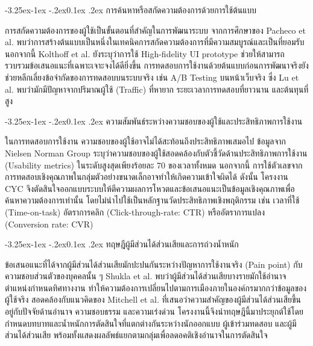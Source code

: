 \documentclass[a4paper,oneside]{cpe-thesis-th}
\makeatletter
\renewcommand\subsection{\@startsection{subsection}{2}{\z@}%
   {-3.25ex\@plus -1ex \@minus -.2ex}{0.1ex \@plus .2ex}%
   {\normalfont\thsz@subsection\bfseries}}
\newcommand{\thaijustify}[1]{%
  \par\hspace{30pt}\justifying
  #1
}
\makeatother
\begin{document}
\subsection{การค้นหาหรือสกัดความต้องการด้วยการใช้ต้นแบบ}
\thaijustify{
  การสกัดความต้องการของผู้ใช้เป็นขั้นตอนที่สำคัญในการพัฒนาระบบ จากการศึกษาของ Pacheco et al. \cite{pacheco2018} พบว่าการสร้างต้นแบบเป็นหนึ่งในเทคนิคการสกัดความต้องการที่มีความสมบูรณ์และเป็นที่ยอมรับ นอกจากนี้ Kolthoff et al. \cite{kolthoff2024} ยังระบุว่าการใช้ High-fidelity UI prototype ช่วยให้สามารถรวบรวมข้อเสนอแนะที่เฉพาะเจาะจงได้ดียิ่งขึ้น การทดสอบการใช้งานด้วยต้นแบบก่อนการพัฒนาจริงยังช่วยหลีกเลี่ยงข้อจำกัดของการทดสอบบนระบบจริง เช่น A/B Testing บนหน้าเว็บจริง ซึ่ง Lu et al. \cite{lu2026} พบว่ามักมีปัญหาจากปริมาณผู้ใช้ (Traffic) ที่หายาก ระยะเวลาการทดสอบที่ยาวนาน และต้นทุนที่สูง
}

\subsection{ความสัมพันธ์ระหว่างความชอบของผู้ใช้และประสิทธิภาพการใช้งาน}
\thaijustify{
  ในการทดสอบการใช้งาน ความชอบของผู้ใช้อาจไม่ได้สะท้อนถึงประสิทธิภาพเสมอไป ข้อมูลจาก Nielsen Norman Group \cite{nngroup_satisfaction} ระบุว่าความชอบของผู้ใช้สอดคล้องกับตัวชี้วัดด้านประสิทธิภาพการใช้งาน (Usability metrics) ในระดับสูงสุดเพียงร้อยละ 70 ของเวลาทั้งหมด นอกจากนี้ การใช้ตัวเลขจากการทดสอบเชิงคุณภาพในกลุ่มตัวอย่างขนาดเล็กอาจทำให้เกิดความเข้าใจผิดได้ \cite{nngroup_qualitative} ดังนั้น โครงงาน CYC จึงตัดสินใจออกแบบระบบให้ตีความผลการโหวตและข้อเสนอแนะเป็นข้อมูลเชิงคุณภาพเพื่อค้นหาความต้องการเท่านั้น โดยไม่นำไปใช้เป็นหลักฐานวัดประสิทธิภาพเชิงพฤติกรรม เช่น เวลาที่ใช้ (Time-on-task) อัตราการคลิก (Click-through-rate: CTR) หรืออัตราการแปลง (Conversion rate: CVR)
}

\subsection{ทฤษฎีผู้มีส่วนได้ส่วนเสียและการถ่วงน้ำหนัก}
\thaijustify{
  ข้อเสนอแนะที่ได้จากผู้มีส่วนได้ส่วนเสียมักปะปนกันระหว่างปัญหาการใช้งานจริง (Pain point) กับความชอบส่วนตัวของบุคคลนั้น ๆ Shukla et al. \cite{shukla2025} พบว่าผู้มีส่วนได้ส่วนเสียบางรายมักใช้อำนาจตำแหน่งกำหนดทิศทางงาน ทำให้ความต้องการเปลี่ยนไปตามการเมืองภายในองค์กรมากกว่าข้อมูลของผู้ใช้จริง สอดคล้องกับแนวคิดของ Mitchell et al. \cite{mitchell1997} ที่เสนอว่าความสำคัญของผู้มีส่วนได้ส่วนเสียขึ้นอยู่กับปัจจัยด้านอำนาจ ความชอบธรรม และความเร่งด่วน โครงงานนี้จึงนำทฤษฎีนี้มาประยุกต์ใช้โดยกำหนดบทบาทและน้ำหนักการตัดสินใจที่แตกต่างกันระหว่างนักออกแบบ ผู้เข้าร่วมทดสอบ และผู้มีส่วนได้ส่วนเสีย พร้อมทั้งแสดงผลลัพธ์แยกตามกลุ่มเพื่อลดอคติเชิงอำนาจในการตัดสินใจ
}
\end{document}
